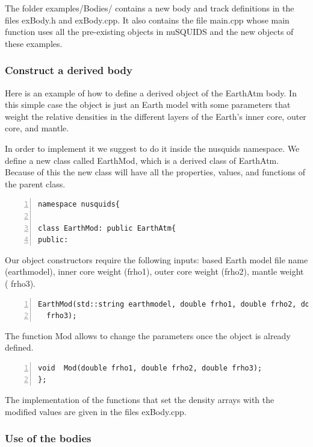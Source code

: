 \documentclass[3p,12pt]{elsarticle}
\newcommand{\ttf}{\ttfamily}
\begin{document}
The folder {\ttf examples/Bodies/} contains a new body and track
definitions in the files {\ttf exBody.h} and {\ttf exBody.cpp}.
It also contains the file {\ttf main.cpp} whose main function 
uses all the pre-existing objects in nuSQUIDS and the new objects
of these examples.


\subsubsection{Construct a derived body}

Here is an example of how to define a derived object of the EarthAtm
body. In this simple case the object is just an Earth model with some
parameters that weight the relative densities in the different layers
of the Earth's inner core, outer core, and mantle.

In order to implement it we suggest to do it inside the {\ttf nusquids}
namespace. We define a new class called {\ttf EarthMod}, which is a derived class of {\ttf
  EarthAtm}. Because of this the new class will have all the properties,
values, and functions of the parent class. 
\begin{lstlisting}[frame=leftline, numbers = left,breaklines=true,label = ex:sin1]
namespace nusquids{

class EarthMod: public EarthAtm{
public:
\end{lstlisting}

Our object constructors require the following inputs:
based Earth model file name ({\ttf earthmodel}), inner core weight
({\ttf frho1}), outer core weight ({\ttf frho2}), mantle weight ({\ttf
  frho3}).

\begin{lstlisting}[frame=leftline, numbers = left,breaklines=true,label = ex:sin1,firstnumber=last]
  EarthMod(std::string earthmodel, double frho1, double frho2, double
  frho3);
\end{lstlisting}
The function {\ttf Mod} allows to change the parameters once the
object is already defined.
\begin{lstlisting}[frame=leftline, numbers =
  left,breaklines=true,label = ex:sin1,firstnumber=last]
  void  Mod(double frho1, double frho2, double frho3);
};

\end{lstlisting}

The implementation of the functions that set the density arrays with
the modified values are given in the files {\ttf exBody.cpp}.

\subsubsection{Use of the bodies}
\end{document}
